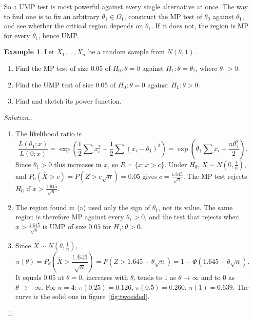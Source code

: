 \documentclass[12pt,a4paper]{report}
\theoremstyle{definition}
\newtheorem{example}[thm]{Example}
\theoremstyle{plain}
\newenvironment{solution}
  {\renewcommand{\qedsymbol}{}\begin{proof}[\textit{Solution}.]}
  {\end{proof}}
\begin{document}
So a UMP test is most powerful against every single alternative at once. The way
to find one is to fix an arbitrary $\theta_1\in\Omega_1$, construct the MP test of
$\theta_0$ against $\theta_1$, and see whether the critical region depends on
$\theta_1$. If it does not, the region is MP for every $\theta_1$, hence UMP.

\begin{example}
\label{ex:umpnormal}
Let $X_1,\dots,X_n$ be a random sample from $N(\theta,1)$.
\begin{enumerate}
\item[(a)] Find the MP test of size $0.05$ of $H_0\colon\theta = 0$ against
$H_1\colon\theta = \theta_1$, where $\theta_1>0$.
\item[(b)] Find the UMP test of size $0.05$ of $H_0\colon\theta = 0$ against
$H_1\colon\theta>0$.
\item[(c)] Find and sketch its power function.
\end{enumerate}
\end{example}

\begin{solution}
\begin{enumerate}
\item[(a)] The likelihood ratio is
\[\frac{L(\theta_1;x)}{L(0;x)}
= \exp\left(\frac12\sum x_i^2 - \frac12\sum(x_i - \theta_1)^2\right)
= \exp\left(\theta_1\sum x_i - \frac{n\theta_1^2}{2}\right).\]
Since $\theta_1>0$ this increases in $\bar x$, so $R = \{x : \bar x>c\}$. Under
$H_0$, $\bar X\sim N(0,\frac1n)$, and $P_0(\bar X>c) = P(Z>c\sqrt n) = 0.05$
gives $c = \frac{1.645}{\sqrt n}$. The MP test rejects $H_0$ if
$\bar x>\frac{1.645}{\sqrt n}$.
\item[(b)] The region found in (a) used only the sign of $\theta_1$, not its
value. The same region is therefore MP against every $\theta_1>0$, and the test
that rejects when $\bar x>\frac{1.645}{\sqrt n}$ is UMP of size $0.05$ for
$H_1\colon\theta>0$.
\item[(c)] Since $\bar X\sim N(\theta,\frac1n)$,
\[\pi(\theta) = P_\theta\left(\bar X>\frac{1.645}{\sqrt n}\right)
= P\left(Z>1.645 - \theta\sqrt n\right) = 1 - \Phi(1.645 - \theta\sqrt n).\]
It equals $0.05$ at $\theta = 0$, increases with $\theta$, tends to $1$ as
$\theta\to\infty$ and to $0$ as $\theta\to-\infty$. For $n = 4$:
$\pi(0.25) = 0.126$, $\pi(0.5) = 0.260$, $\pi(1) = 0.639$. The curve is the solid
one in figure~\ref{fig:twosided}.
\end{enumerate}
\end{solution}
\end{document}
